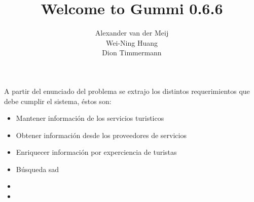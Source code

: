 \documentclass[11pt]{article}
\title{\textbf{Welcome to Gummi 0.6.6}}
\author{Alexander van der Meij\\
		Wei-Ning Huang\\
		Dion Timmermann}
\date{}
\begin{document}
A partir del enunciado del problema se extrajo los distintos requerimientos que debe cumplir el sistema, éstos son:
\begin{itemize}
\item Mantener información de los servicios turisticos
\item Obtener información desde los proveedores de servicios
\item Enriquecer información por experciencia de turistas
\item Búsqueda sad 
\item
\item
\end{itemize}
\end{document}
